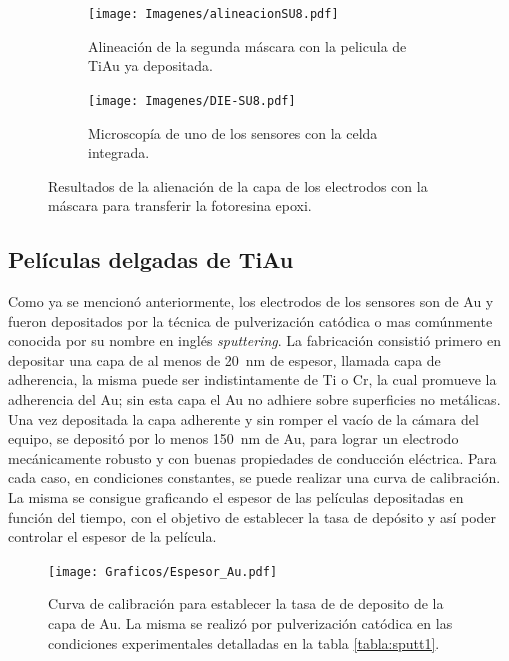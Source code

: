  				\begin{figure}[th]
			 	   	    \centering
			 	   	    \begin{subfigure}[t]{0.495\textwidth}
			        	\texttt{[image: Imagenes/alineacionSU8.pdf]}
			       		\caption{Alineación de la segunda máscara con la pelicula de Ti\textbar Au ya depositada.}
			         	\label{fig:alineacion}
			     		\end{subfigure}
			     		\begin{subfigure}[t]{0.495\textwidth}
			     		\texttt{[image: Imagenes/DIE-SU8.pdf]}
			    		\caption{Microscopía de uno de los sensores con la celda integrada.}
			     		\label{fig:die-su8}	
						\end{subfigure}
						\caption[Alineación y celda integrada en SU8]{Resultados de la alienación de la capa de los electrodos con la máscara para transferir la fotoresina epoxi.}
			     		\label{fig:resultados-su8}
			     	   	\end{figure}

 		\subsection{Películas delgadas de Ti\textbar Au}

		 Como ya se mencionó anteriormente, los electrodos de los sensores son de Au y fueron depositados por la técnica de pulverización catódica o mas comúnmente conocida por su nombre en inglés \textit{sputtering}. La fabricación consistió primero en depositar una capa de al menos de \SI{20}{\nm} de espesor, llamada capa de  adherencia, la misma puede ser indistintamente de Ti o Cr, la cual promueve la adherencia del Au; sin esta capa el Au no adhiere sobre superficies no metálicas.\cite{Hieber1976} Una vez depositada la capa adherente y sin romper el vacío de la cámara del equipo, se depositó por lo menos \SI{150}{nm} de Au, para lograr un electrodo mecánicamente robusto y con buenas propiedades de conducción eléctrica. Para cada caso, en condiciones constantes, se puede realizar una curva de calibración. La misma se consigue graficando el espesor de las películas depositadas en función del tiempo, con el objetivo de establecer la tasa de depósito y así poder controlar el espesor de la película. 

					   		\begin{figure}[ht!]
					   		\begin{center}
							\texttt{[image: Graficos/Espesor\_Au.pdf]}
							\caption[Curca de calibrado para el espesor de los electrodos]{Curva de calibración para establecer la tasa de de deposito de la capa de Au. La misma se realizó por pulverización catódica en las condiciones experimentales detalladas en la tabla \ref{tabla:sputt1}.}
							\label{fig:calibracionAu}
							\end{center}
							\end{figure}


